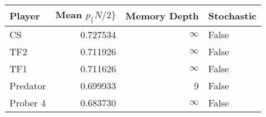 \begin{tabular}{lrrl}
\toprule
   Player &  Mean $p_\{N/2\}$ &  Memory Depth & Stochastic \\
\midrule
       CS &        0.727534 &            \(\infty\) &      False \\
      TF2 &        0.711926 &            \(\infty\) &      False \\
      TF1 &        0.711626 &            \(\infty\) &      False \\
 Predator &        0.699933 &             9 &      False \\
 Prober 4 &        0.683730 &            \(\infty\) &      False \\
\bottomrule
\end{tabular}
